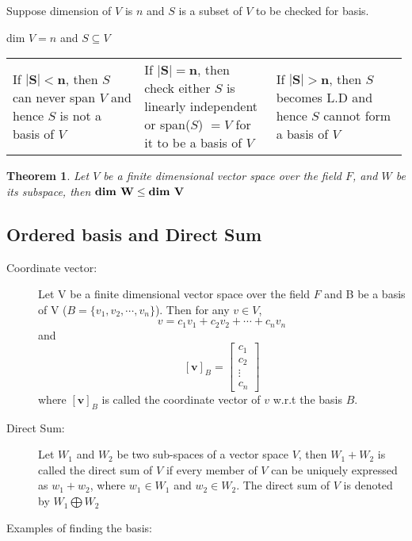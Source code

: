 \documentclass[a4paper, titlepage]{article}
\newtheorem{theorem}{Theorem}[section]
\begin{document}
        Suppose dimension of $V$ is $n$ and $S$ is a subset of $V$
        to be checked for basis.
        \begin{center}
            dim $V = n$ and $S \subseteq V$
        \end{center}

        \begin{minipage}[c]{0.9\linewidth}
            \begin{tabularx}{\linewidth}{p{0.33\linewidth} p{0.33\linewidth} p{0.33\linewidth}}
                If $\bm{|S| < n}$, then $S$ can never span $V$ and hence $S$ 
                is not a basis of $V$
                &
                If $\bm{|S| = n}$, then check either $S$ is linearly independent 
                or span($S$) $= V$ for it to be a basis of $V$
                &
                If $\bm{|S| > n}$, then $S$ becomes L.D and hence $S$ cannot form 
                a basis of $V$
            \end{tabularx}
        \end{minipage}

        \begin{theorem}
            Let $V$ be a finite dimensional vector space over the field
            $F$, and $W$ be its subspace, then $\textbf{\textup{dim}
            W} \le \textbf{\textup{dim} V}$
        \end{theorem}
    
    \subsection{Ordered basis and Direct Sum}
        \begin{description}
            \item[Coordinate vector:] Let V be a finite dimensional
            vector space over the field $F$ and B be a basis of V
            ($B = \{ v_1, v_2, \cdots, v_n \} $). Then for any 
            $v \in V$, $$v = c_1v_1 + c_2v_2 + \cdots + c_nv_n$$
            and $$
                    \bm{[v]}_B = \begin{bmatrix}
                                c_1 \\ c_2 \\ \vdots \\ c_n
                            \end{bmatrix}
                $$
            where $\bm{[v]}_B$ is called the coordinate vector of $v$ 
            w.r.t the basis $B$.
            \item[Direct Sum:] Let $W_1$ and $W_2$ be two sub-spaces
            of a vector space $V$, then $W_1 + W_2$ is called the 
            direct sum of $V$ if every member of $V$ can be uniquely 
            expressed as $w_1 + w_2$, where $w_1 \in W_1$ and 
            $w_2 \in W_2$. The direct sum of $V$ is denoted by
            $W_1 \bigoplus W_2$
            \item[Examples of finding the basis: ]
        \end{description}
\end{document}
